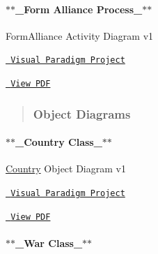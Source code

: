 \paragraph*{$\ast$$\ast$\+\_\+\+Form Alliance Process\+\_\+$\ast$$\ast$ ~\newline
}

Form\+Alliance Activity Diagram v1
\begin{DoxyItemize}
\item \href{https://drive.google.com/file/d/1n-Yo6yf94kIuEdWytGLKXh0qyNkW19AO/view?usp=share_link}{\texttt{ Visual Paradigm Project}}~\newline

\item \href{https://drive.google.com/file/d/1m0-UtwP5NvZf0jkM50MxH-uTexhTJyZ0/view?usp=share_link}{\texttt{ View P\+DF}}~\newline

\end{DoxyItemize}



 \begin{quote}
\subsubsection*{Object Diagrams}

\end{quote}
\paragraph*{$\ast$$\ast$\+\_\+\+Country Class\+\_\+$\ast$$\ast$  ~\newline
}

\mbox{\hyperlink{class_country}{Country}} Object Diagram v1
\begin{DoxyItemize}
\item \href{https://drive.google.com/file/d/1o-yb0Q_Z0BzptcrSWAvSTLCP9nwzNUqK/view?usp=share_link}{\texttt{ Visual Paradigm Project}}~\newline

\item \href{https://drive.google.com/file/d/1Fl_qa9S4h0BwcSmeAWQPxSTX0iEP8uHC/view?usp=share_link}{\texttt{ View P\+DF}}~\newline

\end{DoxyItemize}

\paragraph*{$\ast$$\ast$\+\_\+\+War Class\+\_\+$\ast$$\ast$  ~\newline
}

